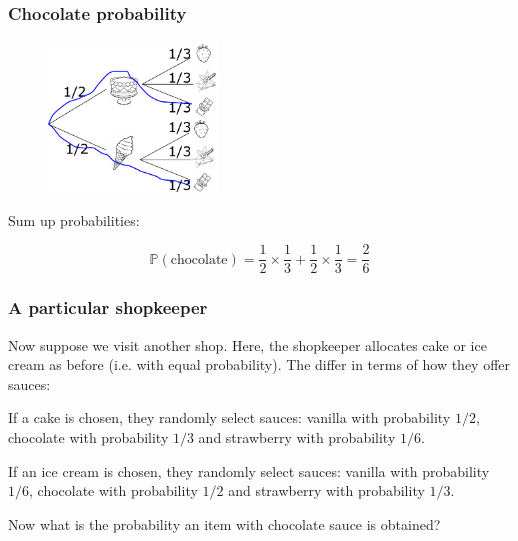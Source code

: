 \documentclass{beamer}
\begin{document}
	\begin{frame}
		\frametitle{Chocolate probability}
		
		\begin{figure}[ht]
			\centerline{\includegraphics[width=0.4\textwidth]{./figures/tree-prob-choc.pdf}}
		\end{figure}
	
	Sum up probabilities:
	
	\begin{equation}
		\mathbb{P}(\text{chocolate}) = \frac{1}{2} \times \frac{1}{3} +  \frac{1}{2} \times \frac{1}{3} = \frac{2}{6}
	\end{equation}
	
	\end{frame}

	\begin{frame}
		\frametitle{A particular shopkeeper}
		Now suppose we visit another shop. Here, the shopkeeper allocates cake or ice cream as before (i.e. with equal probability). The differ in terms of how they offer sauces:
		
		\vspace{0.5cm}
		
		If a cake is chosen, they randomly select sauces: vanilla with probability $1/2$, chocolate with probability $1/3$ and strawberry with probability $1/6$.
		
		\vspace{0.5cm}
		
		If an ice cream is chosen, they randomly select sauces: vanilla with probability $1/6$, chocolate with probability $1/2$ and strawberry with probability $1/3$.
		
		\vspace{0.5cm}
		
		Now what is the probability an item with chocolate sauce is obtained?
		
	\end{frame}
\end{document}
